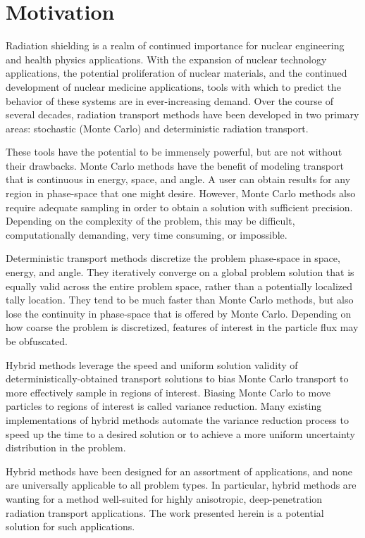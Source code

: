 \section{Motivation}
\label{sec:motivation}

Radiation shielding is a realm of continued importance for nuclear engineering
and health physics applications. With the expansion of nuclear technology
applications,
the potential proliferation of nuclear materials, and the continued development of
nuclear medicine applications, tools with which to predict the behavior
of these systems are
in ever-increasing demand. Over the course of several decades, radiation
transport methods have been developed in two primary areas: stochastic (Monte
Carlo) and
deterministic radiation transport.

These tools have the potential to be immensely
powerful, but are not without their drawbacks. Monte Carlo methods have the
benefit of modeling transport that is continuous in energy, space, and angle.
A user can obtain results for any region in phase-space that one might desire.
However, Monte Carlo methods also require adequate sampling in order to obtain a
solution with sufficient precision. Depending on the complexity of the problem,
this may be difficult, computationally demanding, very time consuming,
or impossible.

Deterministic
transport methods discretize the problem phase-space in space, energy, and
angle. They iteratively converge on a global problem solution that is equally
valid across the entire problem space, rather than a potentially localized tally
location. They tend to be much faster than Monte Carlo methods, but also lose
the continuity in phase-space that is offered by Monte Carlo. Depending on how
coarse the problem is discretized, features of interest in the particle flux may
be obfuscated.

Hybrid methods leverage the speed and uniform solution validity of
deterministically-obtained transport solutions to bias Monte Carlo transport to
more effectively sample in regions of interest. Biasing Monte Carlo to move
particles to regions of interest is called variance reduction. Many existing
implementations of hybrid methods
automate the variance reduction process to speed up the time to a
desired solution or to achieve a more uniform uncertainty distribution in the
problem.

Hybrid methods have been designed for an assortment of applications, and none are
universally applicable to all problem types. In particular, hybrid methods are
wanting for a method well-suited for
highly anisotropic, deep-penetration radiation transport applications. The work
presented herein is a potential solution for such applications.
